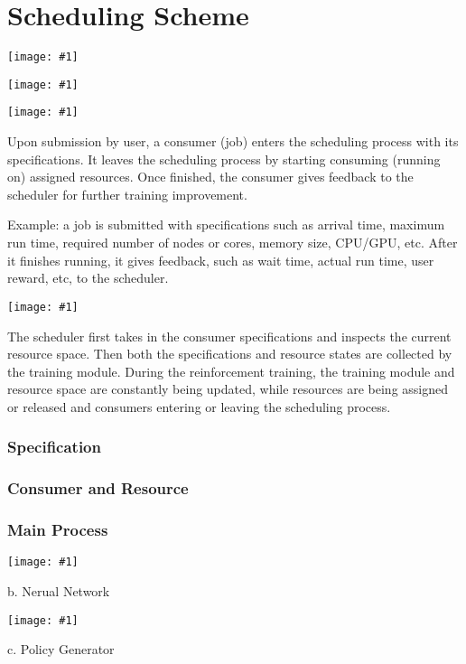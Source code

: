 \documentclass{article}
\theoremstyle{definition}
\theoremstyle{remark}
\newcommand{\addpic}[1]{\texttt{[image: \#1]}}
\begin{document}
	\newpage
	
	\part{Scheduling Scheme}
	
	\addpic{figures/Intro-General.jpg}

	
	\addpic{figures/all-process.jpg}
	
	\addpic{figures/Macro-graph.png} 
	
	
	Upon submission by user, a consumer (job) enters the scheduling process with its specifications. It leaves the scheduling process by starting consuming (running on) assigned resources. Once finished, the consumer gives feedback to the scheduler for further training improvement.
	
	Example: a job is submitted with specifications such as arrival time, maximum run time, required number of nodes or cores, memory size, CPU/GPU, etc. After it finishes running, it gives feedback, such as wait time, actual run time, user reward, etc, to the scheduler.
	
	\addpic{figures/Intro-Scheduler.jpg}

	
	The scheduler first takes in the consumer specifications and inspects the current resource space. Then both the specifications and resource states are collected by the training module. During the reinforcement training, the training module and resource space are constantly being updated, while resources are being assigned or released and consumers entering or leaving the scheduling process.
	

	\section{Specification}
	
	\section{Consumer and Resource}
	
	\section{Main Process}

	\addpic{figures/Training-Main-Process.jpg}

	
	b. Nerual Network


	\addpic{figures/Neural-Network.jpeg}
	
	c. Policy Generator
	
\end{document}
